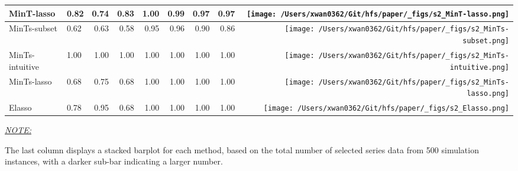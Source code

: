 \documentclass[11pt,a4paper,]{article}
\begin{document}
\begin{table}[!h]
{\begin{threeparttable}
\begin{tabular}{llrrrrrr>{}r}
MinT-lasso & 0.82 & 0.74 & 0.83 & 1.00 & 0.99 & 0.97 & 0.97 & \texttt{[image: /Users/xwan0362/Git/hfs/paper/\_figs/s2\_MinT-lasso.png]}\\
\midrule
MinTs-subset & 0.62 & 0.63 & 0.58 & 0.95 & 0.96 & 0.90 & 0.86 & \texttt{[image: /Users/xwan0362/Git/hfs/paper/\_figs/s2\_MinTs-subset.png]}\\
MinTs-intuitive & 1.00 & 1.00 & 1.00 & 1.00 & 1.00 & 1.00 & 1.00 & \texttt{[image: /Users/xwan0362/Git/hfs/paper/\_figs/s2\_MinTs-intuitive.png]}\\
MinTs-lasso & 0.68 & 0.75 & 0.68 & 1.00 & 1.00 & 1.00 & 1.00 & \texttt{[image: /Users/xwan0362/Git/hfs/paper/\_figs/s2\_MinTs-lasso.png]}\\
\midrule
Elasso & 0.78 & 0.95 & 0.68 & 1.00 & 1.00 & 1.00 & 1.00 & \texttt{[image: /Users/xwan0362/Git/hfs/paper/\_figs/s2\_Elasso.png]}\\
\bottomrule
\end{tabular}
\begin{tablenotes}[para]
\item \underline{\textit{NOTE:}} 
\item The last column displays a stacked barplot for each method, based on the total number of selected series data from 500 simulation instances, with a darker sub-bar indicating a larger number.
\end{tablenotes}
\end{threeparttable}}
\endgroup{}
\end{table}
\end{document}
